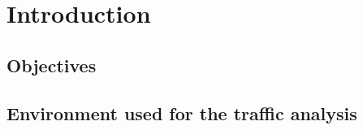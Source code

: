 \section{Introduction}\label{sec:introduction}


\subsection{Objectives}\label{sec:objectives}

\subsection{Environment used for the traffic analysis}\label{sec:environment}
